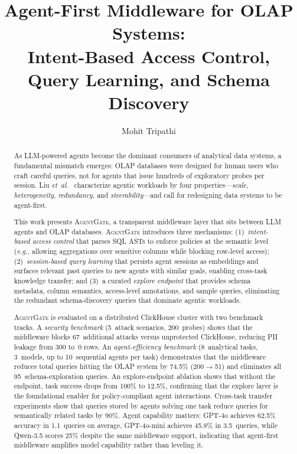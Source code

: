 \documentclass[sigconf, nonacm]{acmart}
\title{Agent-First Middleware for OLAP Systems: \\
       Intent-Based Access Control, Query Learning, and Schema Discovery}
\author{Mohit Tripathi}
\affiliation{%
  \institution{Bloomberg}
}
\newcommand{\sysname}{\textsc{AgentGate}\xspace}  %
\newcommand{\eg}{\textit{e.g.}\xspace}
\newcommand{\etal}{\textit{et~al.}\xspace}
\begin{document}

\begin{abstract}
As LLM-powered agents become the dominant consumers of analytical data systems,
a fundamental mismatch emerges: OLAP databases were designed for human users who
craft careful queries, not for agents that issue hundreds of exploratory probes
per session. Liu \etal~\cite{liu2025sao} characterize agentic workloads by
four properties---\emph{scale}, \emph{heterogeneity}, \emph{redundancy}, and
\emph{steerability}---and call for redesigning data systems to be agent-first.

This work presents \sysname, a transparent middleware layer that sits between
LLM agents and OLAP databases.  \sysname introduces three mechanisms:
(1)~\emph{intent-based access control} that parses SQL ASTs to enforce policies
at the semantic level (\eg, allowing aggregations over sensitive columns while
blocking row-level access);
(2)~\emph{session-based query learning} that persists agent sessions as
embeddings and surfaces relevant past queries to new agents with similar
goals, enabling cross-task knowledge transfer; and
(3)~a curated \emph{explore endpoint} that provides schema metadata, column
semantics, access-level annotations, and sample queries, eliminating the
redundant schema-discovery queries that dominate agentic workloads.

\sysname is evaluated on a distributed ClickHouse cluster with two benchmark
tracks.
A \emph{security benchmark} (5~attack scenarios, 200~probes) shows that the
middleware blocks 67~additional attacks versus unprotected ClickHouse,
reducing PII leakage from 300 to~0 rows.
An \emph{agent-efficiency benchmark} (8~analytical tasks, 3~models, up to
10~sequential agents per task) demonstrates that the middleware reduces total
queries hitting the OLAP system by 74.5\% (200$\to$51) and eliminates all
95~schema-exploration queries.  An explore-endpoint ablation shows that
without the endpoint, task success drops from 100\% to 12.5\%, confirming
that the explore layer is the foundational enabler for policy-compliant agent
interactions.  Cross-task transfer experiments show that queries stored by
agents solving one task reduce queries for semantically related tasks by 90\%.
Agent capability matters: GPT-4o achieves 62.5\% accuracy in 1.1~queries on
average, GPT-4o-mini achieves 45.8\% in 3.5~queries, while Qwen-3.5 scores
25\% despite the same middleware support, indicating that agent-first
middleware amplifies model capability rather than leveling it.
\end{abstract}
\end{document}
